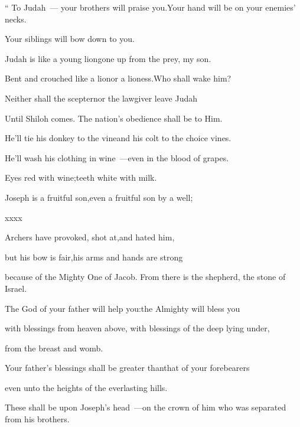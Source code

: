 
\begin{inparaenum}
   ``%
  \pb{} To Judah~--- your brothers will praise you.\pa{}Your hand will be on your enemies' necks.%

  \pa{}Your siblings will bow down to you.%

  \pa{} Judah is like a young lion\pa{}gone up from the prey, my son.%

  \pa{}Bent and crouched like a lion\pa{}or a lioness.\pa{}Who shall wake him?%

  \pa{} Neither shall the scepter\pa{}nor the lawgiver leave Judah%

  \pa{}Until Shiloh comes. The nation's obedience shall be to Him.%

  \pa{} He'll tie his donkey to the vine\pa{}and his colt to the choice vines.%

  \pa{}He'll wash his clothing in wine~---\pa{}even in the blood of grapes.%

  \pa{} Eyes red with wine;\pa{}teeth white with milk.%

  \pb{} Joseph is a fruitful son,\pa{}even a fruitful son by a well;%

  \pa{}xxxx%

  \pa{} Archers have provoked, shot at,\pa{}and hated him,%

  \pa{} but his bow is fair,\pa{}his arms and hands are strong%

  \pa{}because of the Mighty One of Jacob. From there is the shepherd, the stone of Israel.%

  \pa{} The God of your father will help you:\pa{}the Almighty will bless you%

  \pa{}with blessings from heaven above, with blessings of the deep lying under,%

  \pa{}from the breast and womb.%

  \pa{} Your father's blessings shall be greater than\pa{}that of your forebearers%

  \pa{}even unto the heights of the everlasting hills.%

  \pa{}These shall be upon Joseph's head~---\pa{}on the crown of him who was separated from his brothers.%

\end{inparaenum}
